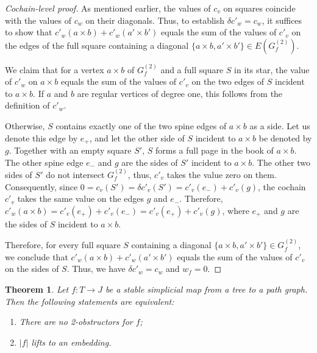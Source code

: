 \documentclass[a4paper,12pt,reqno,oneside]{amsart}
\theoremstyle{plain}
\newtheorem{theorem}{Theorem}
\theoremstyle{definition}
\theoremstyle{plain}
\newcommand{\from}{\colon}
\begin{document}
\begin{proof}[Cochain-level proof]
  As mentioned earlier, the values of $c_v$ on squares coincide with the values of $c_w$ on their
  diagonals. Thus, to establish $\delta c'_w = c_w$, it suffices to show that
  $c'_w(a \times b) + c'_w(a' \times b')$ equals the sum of the values of $c'_v$ on the edges of the
  full square containing a diagonal $\{a \times b, a' \times b'\} \in E(G^{(2)}_f)$.

  We claim that for a vertex $a \times b$ of $G^{(2)}_f$ and a full square $S$ in its star, the value of
  $c'_w$ on $a \times b$ equals the sum of the values of $c'_{v}$ on the two edges of $S$ incident
  to $a \times b$. If $a$ and $b$ are regular vertices of degree one, this follows from the definition
  of $c'_{w}$.

  Otherwise, $S$ contains exactly one of the two spine edges of $a \times b$ as a side.  Let us
  denote this edge by $e_+$, and let the other side of $S$ incident to $a \times b$ be denoted by
  $g$. Together with an empty square $S'$, $S$ forms a full page in the book of $a \times b$. The
  other spine edge $e_-$ and $g$ are the sides of $S'$ incident to $a \times b$. The other two sides
  of $S'$ do not intersect $G^{(2)}_f$, thus, $c'_v$ takes the value zero on them. Consequently,
  since $0 = c_v(S') = \delta c'_v(S') = c'_v(e_-) + c'_v(g)$, the cochain $c'_v$ takes the same
  value on the edges $g$ and $e_-$. Therefore,
  $c'_w(a \times b) = c'_v(e_+) + c'_v(e_-) = c'_v(e_+) + c'_v(g)$, where $e_+$ and $g$ are the
  sides of $S$ incident to $a \times b$.

  Therefore, for every full square $S$ containing a diagonal
  $\{a \times b, a' \times b'\} \in G^{(2)}_f$, we conclude that
  $c'_w(a \times b) + c'_w(a' \times b')$ equals the sum of the values of $c'_v$ on the sides of
  $S$. Thus, we have $\delta c'_w = c_w$ and $w_f = 0$.
\end{proof}

\begin{theorem}\label{thm:complete_2obs}
  Let $f \from T \to J$ be a stable simplicial map from a tree to a path graph. Then the following
  statements are equivalent:
  \begin{enumerate}
  \item There are no 2-obstructors for $f$;
  \item $|f|$ lifts to an embedding.
  \end{enumerate}
\end{theorem}
\end{document}
